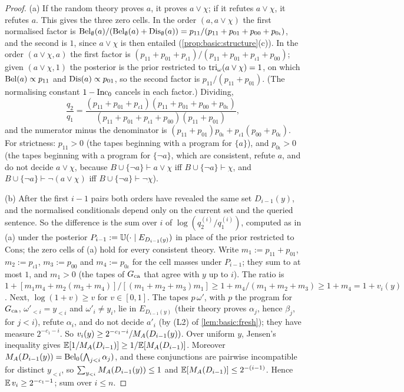\begin{proof}
(a) If the random theory proves $a$, it proves $a\vee\chi$; if it refutes $a\vee\chi$, it refutes $a$. This gives the three zero cells. In the order $(a,a\vee\chi)$ the first normalised factor is $\mathrm{Bel}_\emptyset(a)/(\mathrm{Bel}_\emptyset(a)+\mathrm{Dis}_\emptyset(a))=p_{11}/(p_{11}+p_{01}+p_{00}+p_{0\iota})$, and the second is $1$, since $a\vee\chi$ is then entailed (\cref{prop:basic:structure}(c)). In the order $(a\vee\chi,a)$ the first factor is $(p_{11}+p_{01}+p_{\iota1})/(p_{11}+p_{01}+p_{\iota1}+p_{00})$; given $(a\vee\chi,1)$ the posterior is the prior restricted to $\mathrm{tri}_\omega(a\vee\chi)=1$, on which $\mathrm{Bel}(a)\propto p_{11}$ and $\mathrm{Dis}(a)\propto p_{01}$, so the second factor is $p_{11}/(p_{11}+p_{01})$. (The normalising constant $1-\mathrm{Inc}_0$ cancels in each factor.) Dividing,
\[
\frac{q_2}{q_1}=\frac{(p_{11}+p_{01}+p_{\iota1})(p_{11}+p_{01}+p_{00}+p_{0\iota})}{(p_{11}+p_{01}+p_{\iota1}+p_{00})(p_{11}+p_{01})},
\]
and the numerator minus the denominator is $(p_{11}+p_{01})p_{0\iota}+p_{\iota1}(p_{00}+p_{0\iota})$. For strictness: $p_{11}>0$ (the tapes beginning with a program for $\{a\}$), and $p_{0\iota}>0$ (the tapes beginning with a program for $\{\neg a\}$, which are consistent, refute $a$, and do not decide $a\vee\chi$, because $B\cup\{\neg a\}\vdash a\vee\chi$ iff $B\cup\{\neg a\}\vdash\chi$, and $B\cup\{\neg a\}\vdash\neg(a\vee\chi)$ iff $B\cup\{\neg a\}\vdash\neg\chi$).

(b) After the first $i-1$ pairs both orders have revealed the same set $D_{i-1}(y)$, and the normalised conditionals depend only on the current set and the queried sentence. So the difference is the sum over $i$ of $\log(q^{(i)}_2/q^{(i)}_1)$, computed as in (a) under the posterior $P_{i-1}:=\mathbb{U}(\cdot\mid E_{D_{i-1}(y)})$ in place of the prior restricted to $\mathrm{Cons}$; the zero cells of (a) hold for every consistent theory. Write $m_1:=p_{11}+p_{01}$, $m_2:=p_{\iota1}$, $m_3:=p_{00}$ and $m_4:=p_{0\iota}$ for the cell masses under $P_{i-1}$; they sum to at most $1$, and $m_1>0$ (the tapes of $G_{\rm ca}$ that agree with $y$ up to $i$). The ratio is $1+[m_1m_4+m_2(m_3+m_4)]/[(m_1+m_2+m_3)m_1]\ge1+m_4/(m_1+m_2+m_3)\ge1+m_4=1+v_i(y)$. Next, $\log(1+v)\ge v$ for $v\in[0,1]$. The tapes $p\,\omega'$, with $p$ the program for $G_{\rm ca}$, $\omega'_{<i}=y_{<i}$ and $\omega'_i\ne y_i$, lie in $E_{D_{i-1}(y)}$ (their theory proves $\alpha_j$, hence $\beta_j$, for $j<i$), refute $\alpha_i$, and do not decide $a'_i$ (by (L2) of \cref{lem:basic:fresh}); they have measure $2^{-c_1-i}$. So $v_i(y)\ge2^{-c_1-i}/M_{A}(D_{i-1}(y))$. Over uniform $y$, Jensen's inequality gives $\mathbb{E}[1/M_{A}(D_{i-1})]\ge1/\mathbb{E}[M_{A}(D_{i-1})]$. Moreover $M_{A}(D_{i-1}(y))=\mathrm{Bel}_0(\bigwedge_{j<i}\alpha_j)$, and these conjunctions are pairwise incompatible for distinct $y_{<i}$, so $\sum_{y_{<i}}M_{A}(D_{i-1}(y))\le1$ and $\mathbb{E}[M_{A}(D_{i-1})]\le2^{-(i-1)}$. Hence $\mathbb{E}\,v_i\ge2^{-c_1-1}$; sum over $i\le n$.
\end{proof}

